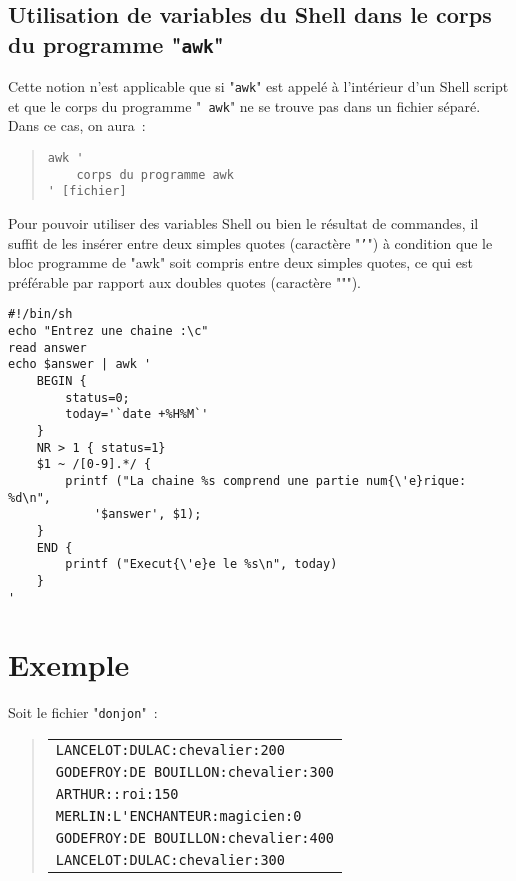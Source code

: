 \subsection{Utilisation de variables du Shell dans le corps du programme 
				"\texttt{awk}"}
				
Cette notion n'est applicable que si "\texttt{awk}" est appel{\'e} {\`a}
l'int{\'e}rieur d'un Shell script et que le corps du programme "{\tt
awk}" ne se trouve pas dans un fichier s{\'e}par{\'e}. Dans ce cas, on aura~:
\begin{quote}
\begin{verbatim}
awk '
    corps du programme awk
' [fichier]
\end{verbatim}
\end{quote}

Pour pouvoir utiliser des variables Shell ou bien le r{\'e}sultat de
commandes, il suffit de les ins{\'e}rer entre deux simples quotes (caract{\`e}re
"\texttt{'}") {\`a} condition que le bloc programme de "awk" soit compris
entre deux simples quotes, ce qui est pr{\'e}f{\'e}rable par rapport aux doubles
quotes (caract{\`e}re """).

\begin{example}
\begin{verbatim}
#!/bin/sh
echo "Entrez une chaine :\c"
read answer
echo $answer | awk '
    BEGIN {
        status=0;
        today='`date +%H%M`'
    }
    NR > 1 { status=1}
    $1 ~ /[0-9].*/ {
        printf ("La chaine %s comprend une partie num{\'e}rique: %d\n",
            '$answer', $1);
    }
    END {
        printf ("Execut{\'e}e le %s\n", today)
    }
'
\end{verbatim}
\end{example}



\section{\label{adv-fltrs-awk-ex}Exemple}

Soit le fichier "\texttt{donjon}"~:
\begin{quote}
\begin{tabular}{|l|}
	\hline
	\verb=LANCELOT:DULAC:chevalier:200=	\\
	\verb=GODEFROY:DE BOUILLON:chevalier:300=	\\
	\verb=ARTHUR::roi:150=	\\
	\verb=MERLIN:L'ENCHANTEUR:magicien:0=	\\
	\verb=GODEFROY:DE BOUILLON:chevalier:400=	\\
	\verb=LANCELOT:DULAC:chevalier:300=	\\
	\hline
\end{tabular}
\end{quote}


